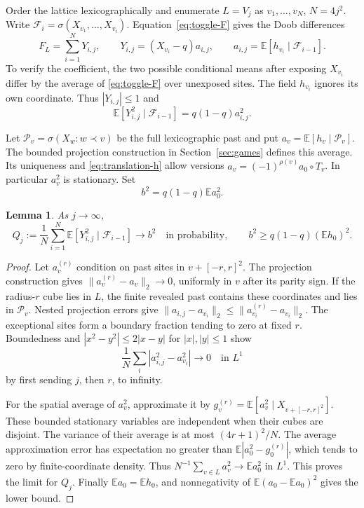 \documentclass[11pt,a4paper]{article}
\newcommand{\E}{\mathbb E}
\newtheorem{lemma}[theorem]{Lemma}
\numberwithin{equation}{section}
\begin{document}
Order the lattice lexicographically and enumerate $L=V_j$ as
$v_1,\ldots,v_N$, $N=4j^2$. Write
$\mathcal F_i=\sigma(X_{v_1},\ldots,X_{v_i})$.
Equation~\eqref{eq:toggle-F} gives the Doob differences
\begin{equation}\label{eq:doob}
 F_L=\sum_{i=1}^N Y_{i,j},\qquad
 Y_{i,j}=(X_{v_i}-q)a_{i,j},\qquad
 a_{i,j}=\E[h_{v_i}\mid\mathcal F_{i-1}].
\end{equation}
To verify the coefficient, the two possible conditional means after
exposing $X_{v_i}$ differ by the average of \eqref{eq:toggle-F} over
unexposed sites. The field $h_{v_i}$ ignores its own coordinate.
Thus $|Y_{i,j}|\le1$ and
\[
 \E[Y_{i,j}^2\mid\mathcal F_{i-1}]=q(1-q)a_{i,j}^2.
\]

Let $\mathcal P_v=\sigma(X_w:w\prec v)$ be the full lexicographic past and
put $a_v=\E[h_v\mid\mathcal P_v]$. The bounded projection construction in
Section~\ref{sec:games} defines this average. Its uniqueness and
\eqref{eq:translation-h} allow versions
$a_v=(-1)^{\rho(v)}a_0\circ T_v$. In particular $a_v^2$ is stationary.
Set
\[
 b^2=q(1-q)\E a_0^2.
\]

\begin{lemma}\label{lem:variance}
As $j\to\infty$,
\begin{equation}\label{eq:variance-limit}
 Q_j:=\frac1N\sum_{i=1}^N
 \E[Y_{i,j}^2\mid\mathcal F_{i-1}]
 \longrightarrow b^2\quad\text{in probability},
 \qquad b^2\ge q(1-q)(\E h_0)^2.
\end{equation}
\end{lemma}
\begin{proof}
Let $a_v^{(r)}$ condition on past sites in $v+[-r,r]^2$.
The projection construction gives
$\|a_v^{(r)}-a_v\|_2\to0$, uniformly in $v$ after its parity sign.
If the radius-$r$ cube lies in $L$, the finite revealed past contains
these coordinates and lies in $\mathcal P_v$. Nested projection errors
give
$\|a_{i,j}-a_{v_i}\|_2\le\|a_{v_i}^{(r)}-a_{v_i}\|_2$.
The exceptional sites form a boundary fraction tending to zero at fixed
$r$. Boundedness and $|x^2-y^2|\le2|x-y|$ for $|x|,|y|\le1$ show
\[
 \frac1N\sum_i |a_{i,j}^2-a_{v_i}^2|\longrightarrow0
 \quad\text{in }L^1
\]
by first sending $j$, then $r$, to infinity.

For the spatial average of $a_v^2$, approximate it by
$g_v^{(r)}=\E[a_v^2\mid X_{v+[-r,r]^2}]$.
These bounded stationary variables are independent when their cubes
are disjoint. The variance of their average is at most $(4r+1)^2/N$.
The average approximation error has expectation no greater than
$\E|a_0^2-g_0^{(r)}|$, which tends to zero by finite-coordinate density.
Thus $N^{-1}\sum_{v\in L}a_v^2\to\E a_0^2$ in $L^1$.
This proves the limit for $Q_j$.
Finally $\E a_0=\E h_0$, and nonnegativity of
$\E(a_0-\E a_0)^2$ gives the lower bound.
\end{proof}
\end{document}
